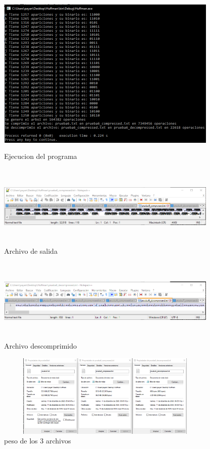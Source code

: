 \documentclass[spanish]{article}
\begin{document}
	\begin{figure}[H]
		\centering
		\includegraphics[width=400px,height=300px]{captura37}
		\caption{Ejecucion del programa}
	\end{figure}
	\begin{figure}[H]
		\centering
		\includegraphics[width=400px,height=150px]{captura38}
		\caption{Archivo de salida}
	\end{figure}
	\begin{figure}[H]
		\centering
		\includegraphics[width=400px,height=150px]{captura39}
		\caption{Archivo descomprimido}
	\end{figure}
	\begin{figure}[H]
		\centering
		\includegraphics[width=400px,height=150px]{captura40}
		\caption{peso de los 3 archivos}
	\end{figure}
\end{document}

